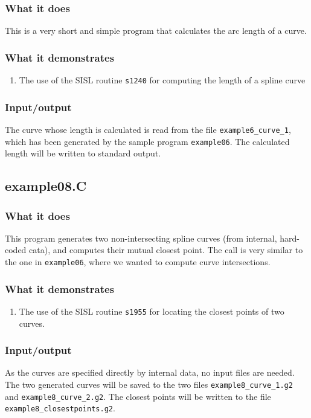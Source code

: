 \subsubsection{What it does}
This is a very short and simple program that calculates the arc length of a curve.
\subsubsection{What it demonstrates}
\begin{enumerate}
\item The use of the SISL routine \verb/s1240/ for computing the length of a spline curve
\end{enumerate}
\subsubsection{Input/output}
The curve whose length is calculated is read from the file \verb/example6_curve_1/, which
has been generated by the sample program \verb/example06/.  The calculated length will be
written to standard output.

\subsection{example08.C}

\subsubsection{What it does}
This program generates two non-intersecting spline curves (from internal, hard-coded cata), and
computes their mutual closest point.  The call is very similar to the one in \verb/example06/, 
where we wanted to compute curve intersections.
\subsubsection{What it demonstrates}
\begin{enumerate}
\item The use of the SISL routine \verb/s1955/ for locating the closest points of two curves.
\end{enumerate}
\subsubsection{Input/output}
As the curves are specified directly by internal data, no input files are needed.\\
The two generated curves will be saved to the two files \verb/example8_curve_1.g2/ and 
\verb/example8_curve_2.g2/.  The closest points will be written to the file \\
\verb/example8_closestpoints.g2/.

